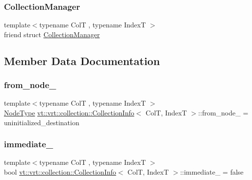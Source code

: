 \subsubsection{\texorpdfstring{Collection\+Manager}{CollectionManager}}
{\footnotesize\ttfamily template$<$typename ColT , typename IndexT $>$ \\
friend struct \hyperlink{structvt_1_1vrt_1_1collection_1_1_collection_manager}{Collection\+Manager}\hspace{0.3cm}{\ttfamily [friend]}}



\subsection{Member Data Documentation}
\mbox{\label{structvt_1_1vrt_1_1collection_1_1_collection_info_a16213a751f7753963ab2671ecab931d3}} 
\subsubsection{\texorpdfstring{from\+\_\+node\+\_\+}{from\_node\_}}
{\footnotesize\ttfamily template$<$typename ColT , typename IndexT $>$ \\
\hyperlink{namespacevt_a866da9d0efc19c0a1ce79e9e492f47e2}{Node\+Type} \hyperlink{structvt_1_1vrt_1_1collection_1_1_collection_info}{vt\+::vrt\+::collection\+::\+Collection\+Info}$<$ ColT, IndexT $>$\+::from\+\_\+node\+\_\+ = uninitialized\+\_\+destination\hspace{0.3cm}{\ttfamily [private]}}

\mbox{\label{structvt_1_1vrt_1_1collection_1_1_collection_info_abee4e28cb909a7e5996274f916138c5e}} 
\subsubsection{\texorpdfstring{immediate\+\_\+}{immediate\_}}
{\footnotesize\ttfamily template$<$typename ColT , typename IndexT $>$ \\
bool \hyperlink{structvt_1_1vrt_1_1collection_1_1_collection_info}{vt\+::vrt\+::collection\+::\+Collection\+Info}$<$ ColT, IndexT $>$\+::immediate\+\_\+ = false\hspace{0.3cm}{\ttfamily [private]}}

